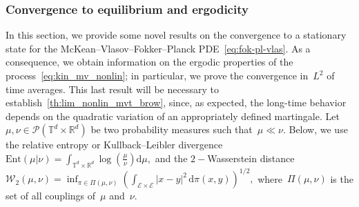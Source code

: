 \documentclass[onefignum,onetabnum]{siamart251216} %
\renewcommand{\d}{\mathrm{d}}
\newcommand{\torus}{\mathbb T}
\newcommand{\real}{\mathbb R}
\newcommand{\mc}[1]{\mathcal{#1}}
\renewcommand{\leq}{\leqslant}
\theoremstyle{plain}
\numberwithin{equation}{section}
\numberwithin{theorem}{section}
\begin{document}
\subsubsection{Convergence to equilibrium and ergodicity}
\label{sec:cvg_eq_ergo}
In this section, we provide some novel results on the convergence to a stationary state for the McKean--Vlasov--Fokker--Planck PDE~\eqref{eq:fok-pl-vlas}. As a consequence, we obtain information on the ergodic properties of the process~\eqref{eq:kin_mv_nonlin}; in particular, we prove the convergence in~$L^2$ of time averages. This last result will be necessary to establish~\cref{th:lim_nonlin_mvt_brow}, since, as expected, the long-time behavior depends on the quadratic variation of an appropriately defined martingale. Let~$\mu,\nu \in \mc{P}(\torus^d \times \real^d)$ be two probability measures such that~$\mu \ll \nu$. Below, we use the relative entropy or Kullback--Leibler divergence
$
    \text{Ent}(\mu|\nu) = \int_{\torus^d \times \real^d} \log\!\left(\frac{ \mu}{ \nu}\right)\!\d \mu,
$ and the $2-$Wasserstein distance
$
    \mc{W}_2(\mu,\nu) = \inf_{\pi \in \Pi (\mu,\nu)} \left(\int_{\mc{E}\times \mc{E}} |x-y|^2 \,\d \pi(x,y)\right)^{1/2},
$
where~$\Pi(\mu,\nu)$ is the set of all couplings of~$\mu$ and~$\nu$.
\end{document}
